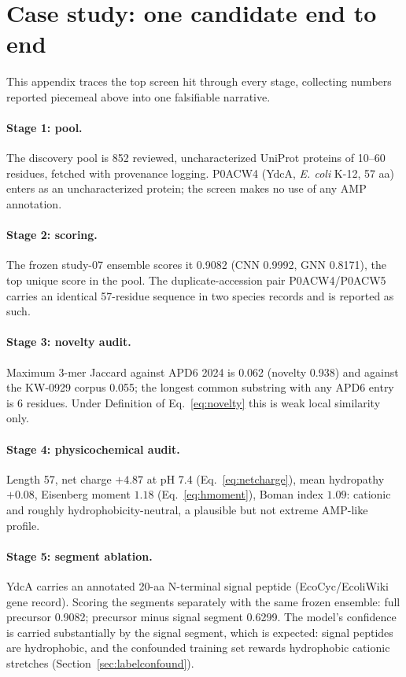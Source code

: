 
\section{Case study: one candidate end to end}\label{app:case}
This appendix traces the top screen hit through every stage, collecting
numbers reported piecemeal above into one falsifiable narrative.

\paragraph{Stage 1: pool.} The discovery pool is 852 reviewed,
uncharacterized UniProt proteins of 10--60 residues, fetched with
provenance logging. P0ACW4 (YdcA, \emph{E. coli} K-12, 57 aa) enters as an
uncharacterized protein; the screen makes no use of any AMP annotation.

\paragraph{Stage 2: scoring.} The frozen study-07 ensemble scores it
0.9082 (CNN 0.9992, GNN 0.8171), the top unique score in the pool. The
duplicate-accession pair P0ACW4/P0ACW5 carries an identical 57-residue
sequence in two species records and is reported as such.

\paragraph{Stage 3: novelty audit.} Maximum 3-mer Jaccard against APD6
2024 is 0.062 (novelty 0.938) and against the KW-0929 corpus 0.055; the
longest common substring with any APD6 entry is 6 residues. Under
Definition of Eq.~\eqref{eq:novelty} this is weak local similarity only.

\paragraph{Stage 4: physicochemical audit.} Length 57, net charge
$+4.87$ at pH 7.4 (Eq.~\eqref{eq:netcharge}), mean hydropathy $+0.08$,
Eisenberg moment $1.18$ (Eq.~\eqref{eq:hmoment}), Boman index $1.09$:
cationic and roughly hydrophobicity-neutral, a plausible but not extreme
AMP-like profile.

\paragraph{Stage 5: segment ablation.} YdcA carries an annotated 20-aa
N-terminal signal peptide (EcoCyc/EcoliWiki gene record). Scoring the
segments separately with the same frozen ensemble: full precursor 0.9082;
precursor minus signal segment 0.6299. The model's confidence is carried
substantially by the signal segment, which is expected: signal peptides
are hydrophobic, and the confounded training set rewards hydrophobic
cationic stretches (Section~\ref{sec:labelconfound}).


